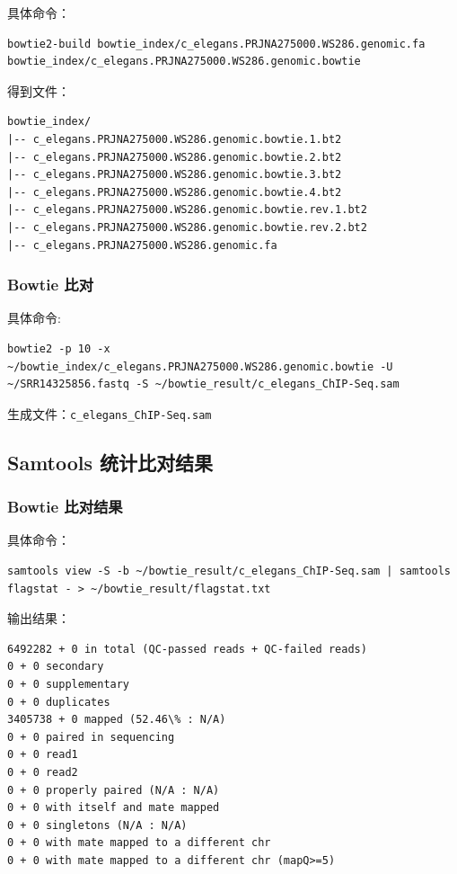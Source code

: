 \documentclass[UTF8]{ctexart}
\begin{document}
具体命令：

\begin{lstlisting}
bowtie2-build bowtie_index/c_elegans.PRJNA275000.WS286.genomic.fa bowtie_index/c_elegans.PRJNA275000.WS286.genomic.bowtie
\end{lstlisting}

得到文件：

\begin{lstlisting}
bowtie_index/
|-- c_elegans.PRJNA275000.WS286.genomic.bowtie.1.bt2
|-- c_elegans.PRJNA275000.WS286.genomic.bowtie.2.bt2
|-- c_elegans.PRJNA275000.WS286.genomic.bowtie.3.bt2
|-- c_elegans.PRJNA275000.WS286.genomic.bowtie.4.bt2
|-- c_elegans.PRJNA275000.WS286.genomic.bowtie.rev.1.bt2
|-- c_elegans.PRJNA275000.WS286.genomic.bowtie.rev.2.bt2
|-- c_elegans.PRJNA275000.WS286.genomic.fa
\end{lstlisting}

\subsubsection{Bowtie 比对}

具体命令:

\begin{lstlisting}
bowtie2 -p 10 -x ~/bowtie_index/c_elegans.PRJNA275000.WS286.genomic.bowtie -U ~/SRR14325856.fastq -S ~/bowtie_result/c_elegans_ChIP-Seq.sam
\end{lstlisting}

生成文件：\verb|c_elegans_ChIP-Seq.sam|

\subsection{Samtools 统计比对结果}

\subsubsection{Bowtie 比对结果}

具体命令：

\begin{lstlisting}
samtools view -S -b ~/bowtie_result/c_elegans_ChIP-Seq.sam | samtools flagstat - > ~/bowtie_result/flagstat.txt
\end{lstlisting}

输出结果：

\begin{lstlisting}
6492282 + 0 in total (QC-passed reads + QC-failed reads)
0 + 0 secondary
0 + 0 supplementary
0 + 0 duplicates
3405738 + 0 mapped (52.46\% : N/A)
0 + 0 paired in sequencing
0 + 0 read1
0 + 0 read2
0 + 0 properly paired (N/A : N/A)
0 + 0 with itself and mate mapped
0 + 0 singletons (N/A : N/A)
0 + 0 with mate mapped to a different chr
0 + 0 with mate mapped to a different chr (mapQ>=5)
\end{lstlisting}
\end{document}
